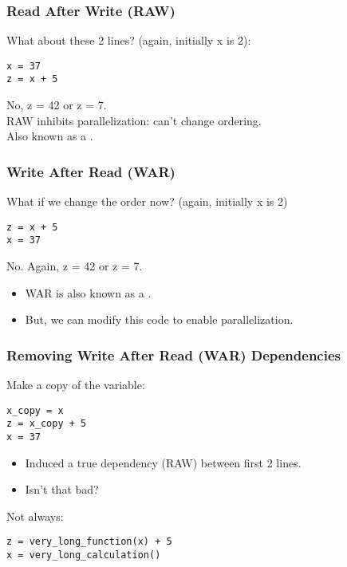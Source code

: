 \begin{frame}[fragile]
\frametitle{Read After Write (RAW)}


What about these 2 lines? (again, initially x is 2):
\begin{lstlisting}
x = 37
z = x + 5
\end{lstlisting}
\pause
\alert{No, z = 42 or z = 7.}\\[1em]

RAW inhibits parallelization: can't change ordering.\\
Also known as a .

\end{frame}

\begin{frame}[fragile]
\frametitle{Write After Read (WAR)}

What if we change the order now? (again, initially x is 2)
\begin{lstlisting}
z = x + 5
x = 37
\end{lstlisting}
\pause
\alert{No. Again, z = 42 or z = 7.}\\[1em]
\begin{itemize}
\item WAR is also known as a .
\item But, we can modify this code to enable parallelization.
\end{itemize}

\end{frame}

\begin{frame}[fragile]
\frametitle{Removing Write After Read (WAR) Dependencies}

Make a copy of the variable:
\begin{lstlisting}
x_copy = x
z = x_copy + 5
x = 37
\end{lstlisting}
\pause
{}
\begin{itemize}
\item Induced a true dependency (RAW) between first 2 lines.
\item Isn't that bad?
\end{itemize}
\pause
Not always:
\begin{lstlisting}
z = very_long_function(x) + 5
x = very_long_calculation()
\end{lstlisting}

\end{frame}

